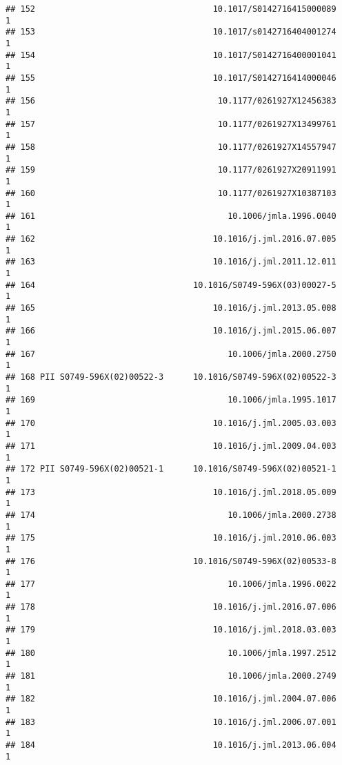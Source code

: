 \documentclass[
  english,
  man]{apa6}
\begin{document}
\begin{verbatim}
## 152                                    10.1017/S0142716415000089            1
## 153                                    10.1017/s0142716404001274            1
## 154                                    10.1017/S0142716400001041            1
## 155                                    10.1017/S0142716414000046            1
## 156                                     10.1177/0261927X12456383            1
## 157                                     10.1177/0261927X13499761            1
## 158                                     10.1177/0261927X14557947            1
## 159                                     10.1177/0261927X20911991            1
## 160                                     10.1177/0261927X10387103            1
## 161                                       10.1006/jmla.1996.0040            1
## 162                                    10.1016/j.jml.2016.07.005            1
## 163                                    10.1016/j.jml.2011.12.011            1
## 164                                10.1016/S0749-596X(03)00027-5            1
## 165                                    10.1016/j.jml.2013.05.008            1
## 166                                    10.1016/j.jml.2015.06.007            1
## 167                                       10.1006/jmla.2000.2750            1
## 168 PII S0749-596X(02)00522-3      10.1016/S0749-596X(02)00522-3            1
## 169                                       10.1006/jmla.1995.1017            1
## 170                                    10.1016/j.jml.2005.03.003            1
## 171                                    10.1016/j.jml.2009.04.003            1
## 172 PII S0749-596X(02)00521-1      10.1016/S0749-596X(02)00521-1            1
## 173                                    10.1016/j.jml.2018.05.009            1
## 174                                       10.1006/jmla.2000.2738            1
## 175                                    10.1016/j.jml.2010.06.003            1
## 176                                10.1016/S0749-596X(02)00533-8            1
## 177                                       10.1006/jmla.1996.0022            1
## 178                                    10.1016/j.jml.2016.07.006            1
## 179                                    10.1016/j.jml.2018.03.003            1
## 180                                       10.1006/jmla.1997.2512            1
## 181                                       10.1006/jmla.2000.2749            1
## 182                                    10.1016/j.jml.2004.07.006            1
## 183                                    10.1016/j.jml.2006.07.001            1
## 184                                    10.1016/j.jml.2013.06.004            1

\end{verbatim}
\end{document}
